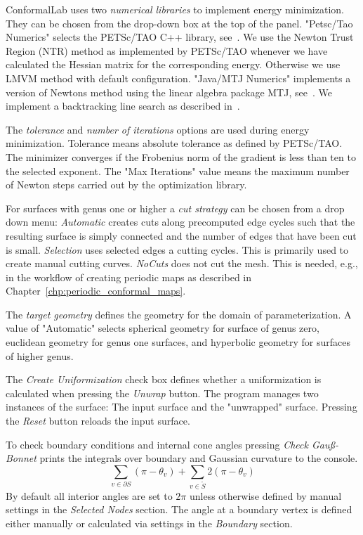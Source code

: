 \documentclass[Thesis.tex]{subfiles}
\begin{document}
{\sc ConformalLab} uses two \emph{numerical libraries} to implement energy minimization. 
They can be chosen from the drop-down box at the top of the panel. 
"Petsc/Tao Numerics" selects the {\sc PETSc/TAO} C++ library, see~\cite{petsc-web-page, tao-user-ref}. 
We use the Newton Trust Region (NTR) method as implemented by {\sc PETSc/TAO} whenever we have calculated the Hessian matrix for the corresponding energy. 
Otherwise we use  LMVM method with default configuration. 
"Java/MTJ Numerics" implements a version of Newtons method using the linear algebra package MTJ, see~\cite{mtj-website}. 
We implement a backtracking line search as described in~\cite[pp.~464]{boyd2004convex}.

The \emph{tolerance} and \emph{number of iterations} options are used during energy minimization. 
Tolerance means absolute tolerance as defined by {\sc PETSc/TAO}. 
The minimizer converges if the Frobenius norm of the gradient is less than ten to the selected exponent. The "Max Iterations" value means the maximum number of Newton steps carried out by the optimization library.

For surfaces with genus one or higher a \emph{cut strategy} can be chosen from a drop down menu: \emph{Automatic} creates cuts along precomputed edge cycles such that the resulting surface is simply connected and the number of edges that have been cut is small. \emph{Selection} uses selected edges a cutting cycles. This is primarily used to create manual cutting curves. \emph{NoCuts} does not cut the mesh. This is needed, e.g., in the workflow of creating periodic maps as described in Chapter~\ref{chp:periodic_conformal_maps}.

The \emph{target geometry} defines the geometry for the domain of parameterization. A value of "Automatic" selects spherical geometry for surface of genus zero, euclidean geometry for genus one surfaces, and hyperbolic geometry for surfaces of higher genus.

The \emph{Create Uniformization} check box defines whether a uniformization is calculated when pressing the \emph{Unwrap} button. The program manages two instances of the surface: The input surface and the "unwrapped" surface. Pressing the \emph{Reset} button reloads the input surface.

To check boundary conditions and internal cone angles pressing \emph{Check Gau\ss-Bonnet} prints the integrals over boundary and Gaussian curvature to the console. 
\[\sum_{v \in \partial S} \left(\pi - \theta_v\right) + \sum_{v \in \mathring{S}}2\left(\pi - \theta_v\right)\]
By default all interior angles are set to $2\pi$ unless otherwise defined by manual settings in the \emph{Selected Nodes} section. The angle at a boundary vertex is defined either manually or calculated via settings in the \emph{Boundary} section.
\end{document}
